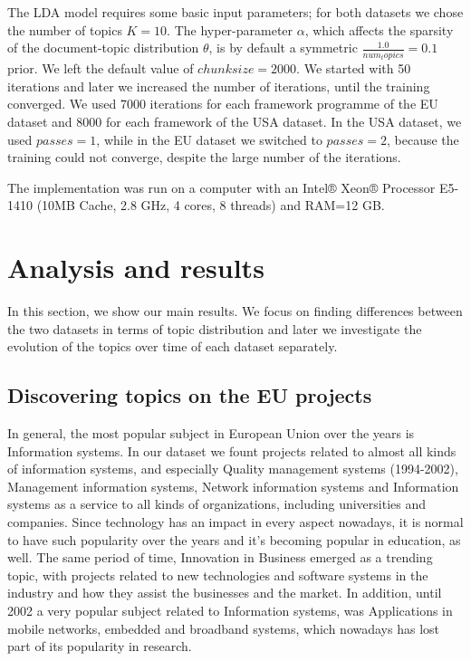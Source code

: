 \documentclass[12pt]{report}
\begin{document}
The LDA model requires some basic input parameters; for both datasets we chose
the number of topics $K=10$. The hyper-parameter $\alpha$, which affects the
sparsity of the document-topic distribution $\theta$, is by default a symmetric
$\frac{1.0}{num_topics} = 0.1$ prior. We left the default value of $chunksize=2000$. We
started with 50 iterations and later we increased the number of iterations,
until the training converged. We used 7000 iterations for each framework
programme of the EU dataset and 8000 for each framework of the USA dataset. In
the USA dataset, we used $passes=1$, while in the EU dataset we switched to
$passes=2$, because the training could not converge, despite the large number of
the iterations.

The implementation was run on a computer with an Intel® Xeon® Processor E5-1410
(10MB Cache, 2.8 GHz, 4 cores, 8 threads) and RAM=12 GB.


\section{Analysis and results}

In this section, we show our main results. We focus on finding differences
between the two datasets in terms of topic distribution and later we 
investigate the evolution of the topics over time of each dataset separately.


\subsection{Discovering topics on the EU projects}

In general, the most popular subject in European Union over the years is
Information systems. In our dataset we fount projects related to almost all
kinds of information systems, and especially Quality management systems
(1994-2002), Management information systems, Network information systems and
Information systems as a service to all kinds of organizations, including
universities and companies. Since technology has an impact in every aspect
nowadays, it is normal to have such popularity over the years and it's becoming
popular in education, as well. The same period of time, Innovation in Business
emerged as a trending topic, with projects related to new technologies and
software systems in the industry and how they assist the businesses and the
market. In addition, until 2002 a very popular subject related to Information
systems, was Applications in mobile networks, embedded and broadband systems,
which nowadays has lost part of its popularity in research.
\end{document}
